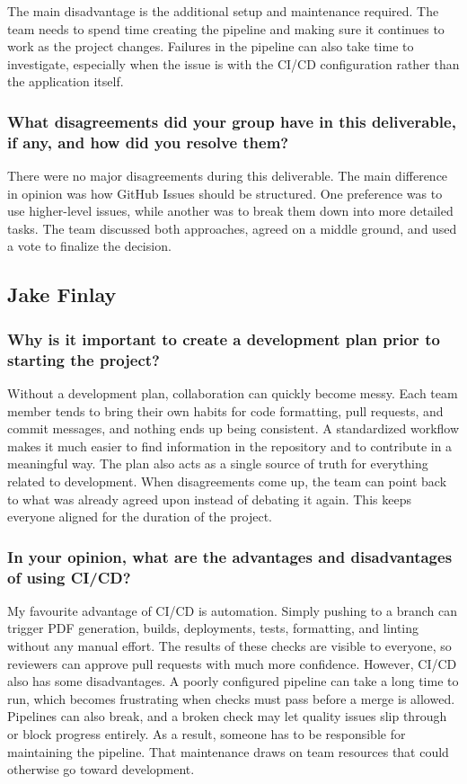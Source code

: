 \documentclass{article}
\begin{document}
The main disadvantage is the additional setup and maintenance required. The team needs to spend time
creating the pipeline and making sure it continues to work as the project changes. Failures in the
pipeline can also take time to investigate, especially when the issue is with the CI/CD configuration
rather than the application itself.

\subsubsection*{What disagreements did your group have in this deliverable, if any, and how did you resolve them?}

There were no major disagreements during this deliverable. The main difference in opinion was
how GitHub Issues should be structured. One preference was to use higher-level issues, while
another was to break them down into more detailed tasks. The team discussed both approaches,
agreed on a middle ground, and used a vote to finalize the decision.

\subsection*{Jake Finlay}

\subsubsection*{Why is it important to create a development plan prior to starting the project?}
Without a development plan, collaboration can quickly become messy. Each team member tends to
bring their own habits for code formatting, pull requests, and commit messages, and nothing ends
up being consistent. A standardized workflow makes it much easier to find information in the
repository and to contribute in a meaningful way. The plan also acts as a single source of truth
for everything related to development. When disagreements come up, the team can point back to
what was already agreed upon instead of debating it again. This keeps everyone aligned for the
duration of the project.

\subsubsection*{In your opinion, what are the advantages and disadvantages of using CI/CD?}
My favourite advantage of CI/CD is automation. Simply pushing to a branch can trigger PDF
generation, builds, deployments, tests, formatting, and linting without any manual effort. The
results of these checks are visible to everyone, so reviewers can approve pull requests with much
more confidence. However, CI/CD also has some disadvantages. A poorly
configured pipeline can take a long time to run, which becomes frustrating when checks must pass
before a merge is allowed. Pipelines can also break, and a broken check may let quality issues slip
through or block progress entirely. As a result, someone has to be responsible for maintaining the
pipeline. That maintenance draws on team resources that could otherwise go toward development.
\end{document}
